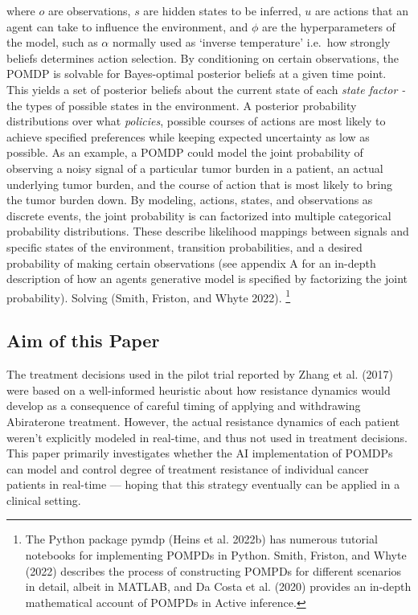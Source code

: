 \documentclass[
]{article}
\begin{document}
where \(o\) are observations, \(s\) are hidden states to be inferred,
\(u\) are actions that an agent can take to influence the environment,
and \(\phi\) are the hyperparameters of the model, such as \(\alpha\)
normally used as `inverse temperature' i.e.~how strongly beliefs
determines action selection. By conditioning on certain observations,
the POMDP is solvable for Bayes-optimal posterior beliefs at a given
time point. This yields a set of posterior beliefs about the current
state of each \emph{state factor -} the types of possible states in the
environment. A posterior probability distributions over what
\emph{policies}, possible courses of actions are most likely to achieve
specified preferences while keeping expected uncertainty as low as
possible. As an example, a POMDP could model the joint probability of
observing a noisy signal of a particular tumor burden in a patient, an
actual underlying tumor burden, and the course of action that is most
likely to bring the tumor burden down. By modeling, actions, states, and
observations as discrete events, the joint probability is can factorized
into multiple categorical probability distributions. These describe
likelihood mappings between signals and specific states of the
environment, transition probabilities, and a desired probability of
making certain observations (see appendix A for an in-depth description
of how an agents generative model is specified by factorizing the joint
probability). Solving (Smith, Friston, and Whyte 2022). \footnote{The
  Python package pymdp (Heins et al. 2022b) has numerous tutorial
  notebooks for implementing POMPDs in Python. Smith, Friston, and Whyte
  (2022) describes the process of constructing POMPDs for different
  scenarios in detail, albeit in MATLAB, and Da Costa et al. (2020)
  provides an in-depth mathematical account of POMPDs in Active
  inference.}

\subsection{Aim of this Paper}\label{aim-of-this-paper}

The treatment decisions used in the pilot trial reported by Zhang et al.
(2017) were based on a well-informed heuristic about how resistance
dynamics would develop as a consequence of careful timing of applying
and withdrawing Abiraterone treatment. However, the actual resistance
dynamics of each patient weren't explicitly modeled in real-time, and
thus not used in treatment decisions. This paper primarily investigates
whether the AI implementation of POMDPs can model and control degree of
treatment resistance of individual cancer patients in real-time ---
hoping that this strategy eventually can be applied in a clinical
setting.
\end{document}
